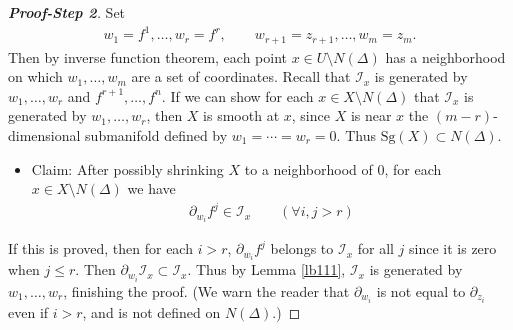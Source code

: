 \documentclass[12pt,b5paper,notitlepage]{report}
\theoremstyle{definition}
\theoremstyle{plain}
\newcommand{\mc}{\mathcal}
\newcommand{\Sg}{\mathrm{Sg}}
\numberwithin{equation}{section}
\begin{document}
\begin{proof}[\textbf{Proof-Step 2}]
Set 
\begin{align*}
w_1=f^1,\dots,w_r=f^r,\qquad w_{r+1}=z_{r+1},\dots,w_m=z_m.
\end{align*}
Then by inverse function theorem, each point $x\in U\setminus N(\varDelta)$ has a neighborhood on which $w_1,\dots,w_m$ are a set of coordinates. Recall that $\mc I_x$ is generated by $w_1,\dots,w_r$ and $f^{r+1},\dots,f^n$. If we can show for each $x\in X\setminus N(\varDelta)$ that $\mc I_x$ is generated by $w_1,\dots,w_r$, then $X$ is smooth at $x$, since $X$ is near $x$ the $(m-r)$-dimensional submanifold defined by $w_1=\cdots=w_r=0$. Thus $\Sg(X)\subset N(\varDelta)$.


\begin{itemize}
\item Claim: After possibly shrinking $X$ to a neighborhood of $0$, for each $x\in X\setminus N(\varDelta)$ we have
\begin{align*}
\partial_{w_i}f^j\in\mc I_x\qquad (\forall i,j>r)
\end{align*}
\end{itemize}
If this is proved, then for each $i>r$, $\partial_{w_i}f^j$ belongs to $\mc I_x$ for all $j$ since it is zero when $j\leq r$. Then $\partial_{w_i}\mc I_x\subset\mc I_x$. Thus by Lemma \ref{lb111}, $\mc I_x$ is generated by $w_1,\dots,w_r$, finishing the proof. (We warn the reader that $\partial_{w_i}$ is not equal to $\partial_{z_i}$ even if $i>r$, and is not defined on $N(\varDelta)$.)


\end{proof}
\end{document}
